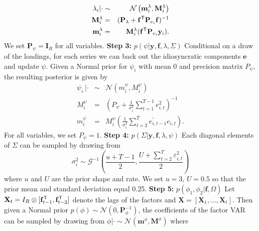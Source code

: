 \documentclass[notitlepage,a4paper,12pt]{article}
\begin{document}
\begin{ThreePartTable}
\begin{eqnarray}\label{eq:posterior_lambda}
    \lambda_{i} | \cdot &\sim& \mathcal{N}\left(\mathbf{m}^{\lambda}_i,\mathbf{M}^{\lambda}_i \right) \\
    \mathbf{M}^{\lambda}_i &=& (\mathbf{P}_{\lambda} + \mathbf{f}^{\sf{T}} \mathbf{P}_{e_i} \mathbf{f})^{-1} \\ 
    \mathbf{m}^{\lambda}_i &=& \mathbf{M}^{\lambda}_i (\mathbf{f}^{\sf{T}} \mathbf{P}_{e_i} \mathbf{y}_i).
\end{eqnarray} 
We set $\mathbf{P}_{\psi} = \mathbf{I}_R$ for all variables. 
\newline
\linebreak
\textbf{Step 3:} $p(\psi| \mathbf{y}, \mathbf{f}, \lambda, \Sigma)$
\newline       
 Conditional on a draw of the loadings, for each series we can back out the idiosyncratic components $\mathbf{e}$ and update $\psi$. Given a Normal prior for $\psi_i$ with mean 0 and precision matrix $P_{\psi}$, the resulting posterior is given by 
    \begin{eqnarray}\label{eq:posterior_psi}
        \psi_{i \boldsymbol{\cdot} } | \cdot &\sim& \mathcal{N}\left( m^{\psi}_i,M^{\psi}_i \right) \\
        M^{\psi}_i &=& \left( P_{\psi} +  \frac{1}{\sigma^2_i} \sum\nolimits_{t=1}^{T-1} e_{i, t}^2 \right)^{-1}\\
        m^{\psi}_i &=& M^{\psi}_i \left( \frac{1}{\sigma^2_i}\sum\nolimits_{t=2}^T e_{i, t-1}^{\prime} e_{i,t} \right).
    \end{eqnarray}
For all variables, we set $P_{\psi} = 1$.
\newline
\linebreak
\textbf{Step 4:} $p(\Sigma| \mathbf{y}, \mathbf{f}, \lambda, \psi)$
\newline       
Each diagonal elements of $\Sigma$ can be sampled by drawing from 
\begin{equation*}
\sigma^2_i \sim \mathcal{G}^{-1} \left( \frac{u + T-1}{2},\frac{U + \sum_{t=2}^T \varepsilon_{i,t}^2}{2} \right)
\end{equation*}  where $u$ and $U$ are the prior shape and rate. We set $u=3, \, U = 0.5$ so that the prior mean and standard deviation equal 0.25. 
\newline
\linebreak
\textbf{Step 5:} $p(\phi_1, \phi_2| \mathbf{f}, \Omega)$
\newline  
Let $\mathbf{X}_t = I_R \otimes [\mathbf{f}^{\sf{T}}_{t-1}, \mathbf{f}^{\sf{T}}_{t-2}]$ denote the lags of the factors and $\mathbf{X} = [\mathbf{X}_1, \dots, \mathbf{X}_t]$. Then given a Normal prior $p(\phi) \sim \mathcal{N}(0, \mathbf{P}_{\phi}^{-1})$, the coefficients of the factor VAR can be sampled by drawing from $\phi | \cdot \sim \mathcal{N}(\mathbf{m}^{\phi}, \mathbf{M}^{\phi})$ where

\end{ThreePartTable}
\end{document}
